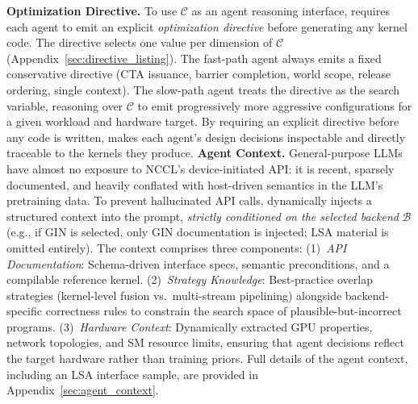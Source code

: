 \noindent\textbf{Optimization Directive.}
To use $\mathcal{C}$ as an agent reasoning interface, \cufuse{} requires each agent to emit an explicit \emph{optimization directive} before generating any kernel code. The directive selects one value per dimension of $\mathcal{C}$ (Appendix~\ref{sec:directive_listing}). The fast-path agent always emits a fixed conservative directive (CTA issuance, barrier completion, world scope, release ordering, single context). The slow-path agent treats the directive as the search variable, reasoning over $\mathcal{C}$ to emit progressively more aggressive configurations for a given workload and hardware target. By requiring an explicit directive before any code is written, \cufuse{} makes each agent's design decisions inspectable and directly traceable to the kernels they produce.
\noindent\textbf{Agent Context.}
General-purpose LLMs have almost no exposure to NCCL's device-initiated API: it is recent, sparsely documented, and heavily conflated with host-driven semantics in the LLM's pretraining data. To prevent hallucinated API calls, \cufuse{} dynamically injects a structured context into the prompt, \emph{strictly conditioned on the selected backend} $\mathcal{B}$ (e.g., if GIN is selected, only GIN documentation is injected; LSA material is omitted entirely). The context comprises three components:
(1)~\emph{API Documentation}: Schema-driven interface specs, semantic preconditions, and a compilable reference kernel.
(2)~\emph{Strategy Knowledge}: Best-practice overlap strategies (kernel-level fusion vs.\ multi-stream pipelining) alongside backend-specific correctness rules to constrain the search space of plausible-but-incorrect programs.
(3)~\emph{Hardware Context}: Dynamically extracted GPU properties, network topologies, and SM resource limits, ensuring that agent decisions reflect the target hardware rather than training priors.
Full details of the agent context, including an LSA interface sample, are provided in Appendix~\ref{sec:agent_context}.

\vspace{-10pt}
